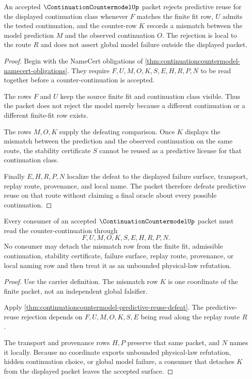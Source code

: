 \begin{theorem}
\label{thm:continuationcountermodel-predictive-reuse-defeat}
An accepted $\ContinuationCountermodelUp$ packet rejects predictive reuse for the displayed continuation class whenever $F$ matches the finite fit row, $U$ admits the tested continuation, and the counter-row $K$ records a mismatch between the model prediction $M$ and the observed continuation $O$. The rejection is local to the route $R$ and does not assert global model failure outside the displayed packet.
\end{theorem}
\begin{proof}
Begin with the NameCert obligations of \autoref{thm:continuationcountermodel-namecert-obligations}. They require $F,U,M,O,K,S,E,H,R,P,N$ to be read together before a counter-continuation is accepted.

The rows $F$ and $U$ keep the source finite fit and continuation class visible. Thus the packet does not reject the model merely because a different continuation or a different finite-fit row exists.

The rows $M,O,K$ supply the defeating comparison. Once $K$ displays the mismatch between the prediction and the observed continuation on the same route, the stability certificate $S$ cannot be reused as a predictive license for that continuation class.

Finally $E,H,R,P,N$ localize the defeat to the displayed failure surface, transport, replay route, provenance, and local name. The packet therefore defeats predictive reuse on that route without claiming a final oracle about every possible continuation.
\end{proof}

\begin{theorem}
\label{thm:continuationcountermodel-replay-nonescape}
Every consumer of an accepted $\ContinuationCountermodelUp$ packet must read the counter-continuation through
$$
F,U,M,O,K,S,E,H,R,P,N.
$$
No consumer may detach the mismatch row from the finite fit, admissible continuation, stability certificate, failure surface, replay route, provenance, or local naming row and then treat it as an unbounded physical-law refutation.
\end{theorem}
\begin{proof}
Use the carrier definition. The mismatch row $K$ is one coordinate of the finite packet, not an independent global falsifier.

Apply \autoref{thm:continuationcountermodel-predictive-reuse-defeat}. The predictive-reuse rejection depends on $F,U,M,O,K,S,E$ being read along the replay route $R$.

The transport and provenance rows $H,P$ preserve that same packet, and $N$ names it locally. Because no coordinate exports unbounded physical-law refutation, hidden continuation choice, or global model failure, a consumer that detaches $K$ from the displayed packet leaves the accepted surface.
\end{proof}

